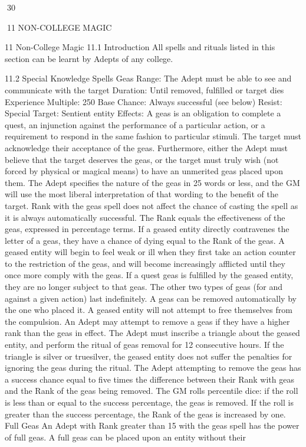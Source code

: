 \documentclass[a4paper]{article}
\begin{document}
\begin{multicols}{3}
30

11 NON-COLLEGE MAGIC

11 Non-College Magic
11.1 Introduction
All spells and rituals listed in this section can be
learnt by Adepts of any college.

11.2 Special Knowledge Spells
Geas
Range: The Adept must be able to see and communicate with the target
Duration: Until removed, fulfilled or target dies
Experience Multiple: 250
Base Chance: Always successful (see below)
Resist: Special
Target: Sentient entity
Effects: A geas is an obligation to complete a
quest, an injunction against the performance of a
particular action, or a requirement to respond in the
same fashion to particular stimuli.
The target must acknowledge their acceptance of
the geas. Furthermore, either the Adept must believe that the target deserves the geas, or the target
must truly wish (not forced by physical or magical
means) to have an unmerited geas placed upon
them. The Adept specifies the nature of the geas in
25 words or less, and the GM will use the most
liberal interpretation of that wording to the benefit
of the target. Rank with the geas spell does not
affect the chance of casting the spell as it is always
automatically successful. The Rank equals the
effectiveness of the geas, expressed in percentage
terms. If a geased entity directly contravenes the
letter of a geas, they have a chance of dying equal
to the Rank of the geas. A geased entity will begin
to feel weak or ill when they first take an action
counter to the restriction of the geas, and will become increasingly afflicted until they once more
comply with the geas.
If a quest geas is fulfilled by the geased entity, they
are no longer subject to that geas. The other two
types of geas (for and against a given action) last
indefinitely. A geas can be removed automatically
by the one who placed it. A geased entity will not
attempt to free themselves from the compulsion.
An Adept may attempt to remove a geas if they
have a higher rank than the geas in effect. The
Adept must inscribe a triangle about the geased
entity, and perform the ritual of geas removal for
12 consecutive hours. If the triangle is silver or
truesilver, the geased entity does not suffer the
penalties for ignoring the geas during the ritual.
The Adept attempting to remove the geas has a
success chance equal to five times the difference
between their Rank with geas and the Rank of the
geas being removed. The GM rolls percentile dice:
if the roll is less than or equal to the success percentage, the geas is removed. If the roll is greater
than the success percentage, the Rank of the geas is
increased by one.
Full Geas An Adept with Rank greater than 15
with the geas spell has the power of full geas. A
full geas can be placed upon an entity without their


\end{multicols}
\end{document}
